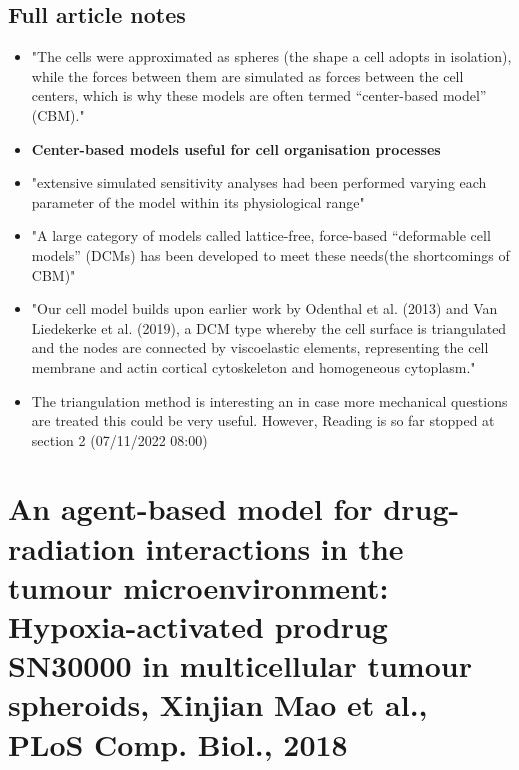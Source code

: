 \documentclass[11pt,a4paper]{article}
\begin{document}
\subsection*{Full article notes}
\begin{itemize}
\item "The cells were approximated as spheres (the shape a cell adopts in isolation), while the forces between them are simulated as forces between the cell centers, which is why these models are often termed “center-based model” (CBM)."
\item \textbf{Center-based models useful for cell organisation processes}
\item "extensive simulated sensitivity analyses had been performed varying each parameter of the model within its physiological range"
\item "A large category of models called lattice-free, force-based “deformable cell models” (DCMs)
has been developed to meet these needs(the shortcomings of CBM)"
\item "Our cell model builds upon earlier work by Odenthal et al. (2013) and Van Liedekerke et al. (2019), a DCM type whereby the cell surface is triangulated and the nodes are connected by viscoelastic elements, representing the cell membrane and actin cortical cytoskeleton and homogeneous cytoplasm."
\item The triangulation method is interesting an in case more mechanical questions are treated this could be very useful. However, Reading is so far stopped at section 2 (07/11/2022 08:00) 
\end{itemize}



\section*{An agent-based model for drug-radiation interactions in the tumour microenvironment: Hypoxia-activated prodrug SN30000 in multicellular tumour spheroids, Xinjian Mao et al., PLoS Comp. Biol., 2018}
\end{document}
